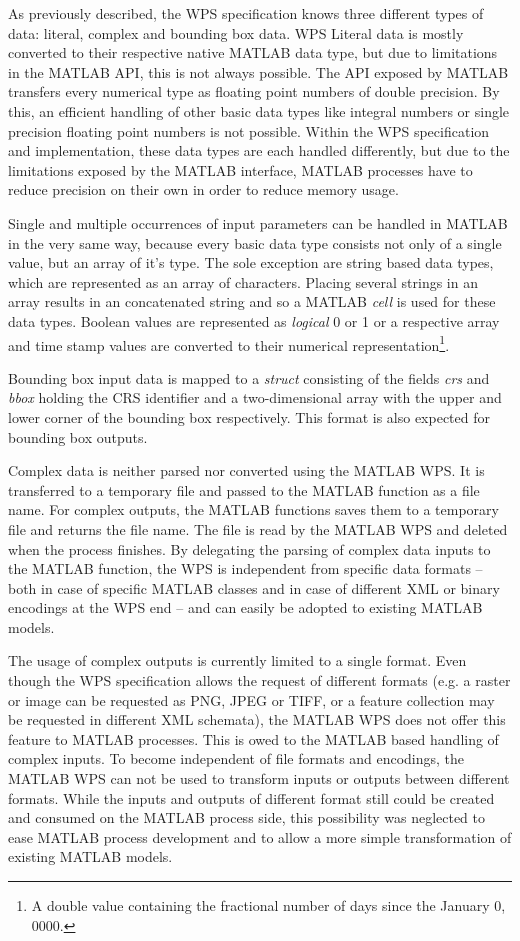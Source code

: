 		As previously described, the \acl{WPS} specification knows three different types of data: literal, complex and bounding box data.
		\ac{WPS} Literal data is mostly converted to their respective native MATLAB data type, but due to limitations in the MATLAB \ac{API}, this is not always possible. The \ac{API} exposed by MATLAB transfers every numerical type as floating point numbers of double precision. By this, an efficient handling of other basic data types like integral numbers or single precision floating point numbers is not possible. Within the WPS specification and implementation, these data types are each handled differently, but due to the limitations exposed by the MATLAB interface, MATLAB processes have to reduce precision on their own in order to reduce memory usage.

		Single and multiple occurrences of input parameters can be handled in MATLAB in the very same way, because every basic data type consists not only of a single value, but an array of it's type. The sole exception are string based data types, which are represented as an array of characters. Placing several strings in an array results in an concatenated string and so a MATLAB \emph{cell} is used for these data types. Boolean values are represented as \emph{logical} 0 or 1 or a respective array and time stamp values are converted to their numerical representation\footnote{A double value containing the fractional number of days since the January 0, 0000.}.

		Bounding box input data is mapped to a \emph{struct} consisting of the fields \emph{crs} and \emph{bbox} holding the \ac{CRS} identifier and a two-dimensional array with the upper and lower corner of the bounding box respectively. This format is also expected for bounding box outputs.

		Complex data is neither parsed nor converted using the MATLAB WPS. It is transferred to a temporary file and passed to the MATLAB function as a file name. For complex outputs, the MATLAB functions saves them to a temporary file and returns the file name. The file is read by the MATLAB WPS and deleted when the process finishes. By delegating the parsing of complex data inputs to the MATLAB function, the WPS is independent from specific data formats -- both in case of specific MATLAB classes and in case of different XML or binary encodings at the WPS end -- and can easily be adopted to existing MATLAB models.

		The usage of complex outputs is currently limited to a single format. Even though the WPS specification allows the request of different formats (e.g. a raster or image can be requested as PNG, JPEG or TIFF, or a feature collection may be requested in different XML schemata), the MATLAB WPS does not offer this feature to MATLAB processes. This is owed to the MATLAB based handling of complex inputs. To  become independent of file formats and encodings, the MATLAB WPS can not be used to transform inputs or outputs between different formats. While the inputs and outputs of different format still could be created and consumed on the MATLAB process side, this possibility was neglected to ease MATLAB process development and to allow a more simple transformation of existing MATLAB models.

